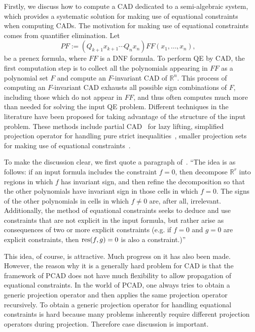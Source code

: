 \documentclass[10pt]{article}
\def\R {\ensuremath{\mathbb{R}}}
\newcommand{\res}[1]{\mbox{{\rm res}$(#1)$}}
\newcommand{\CCAD}{{PCAD}}
\newcommand{\CAD}{{CAD}}
\newcommand{\QE}{{QE}}
\begin{document}
Firstly, we discuss how to compute a CAD dedicated to a semi-algebraic system, 
which provides a systematic solution for making use of equational constraints when computing CADs.
The motivation for making use of equational constraints
comes from quantifier elimination. 
Let $$PF := (Q_{k+1}x_{k+1}\cdots Q_nx_n)FF(x_1,\ldots,x_n),$$ be 
a prenex formula, where $FF$ is a DNF formula. 
To perform {\QE} by {\CAD},
 the first computation step is to collect all the polynomials 
appearing in $FF$ as a polynomial set $F$ and compute an $F$-invariant CAD of $\R^n$.
This process of computing an $F$-invariant CAD  exhausts all possible sign combinations of $F$, 
including those which do not appear in $FF$, 
and thus often computes much more than needed for solving the input QE problem.
Different techniques in the literature have been proposed for taking advantage of the structure of the input problem.
These methods include partial CAD~\cite{ch91} for lazy lifting, 
simplified projection operator for handling pure strict inequalities~\cite{scott93,adam00}, 
smaller projection sets for making use of equational constraints~\cite{Collins98, McCallum2001, Brown05, McCallum2009}.


To make the discussion clear, we first quote a paragraph of~\cite{Brown05}.
``The idea is as follows: if an input formula includes the constraint $f=0$, 
then decompose $\R^r$ into regions in which $f$ has invariant sign, 
and then refine the decomposition so that the other polynomials 
have invariant sign in those cells in which $f=0$. 
The signs of the other polynomials in cells in which $f\neq0$ are, 
after all, irrelevant. 
Additionally, the method of equational constraints seeks 
to deduce and use constraints that are not explicit in the input 
formula, but rather arise as consequences of two or more explicit
constraints (e.g. if $f=0$ and $g=0$ are explicit constraints, 
then $\res{f,g}=0$ is also a constraint.)''

This idea, of course, is attractive.
Much progress on it has also been made. 
However, the reason why it is a generally hard problem 
for CAD is that the framework of {\CCAD} does not have 
much flexibility to allow propagation of equational constraints. 
In the world of {\CCAD}, one always tries to obtain a generic 
projection operator and then applies the same projection operator 
recursively. To obtain a generic projection operator 
for handling equational constraints is hard
because many problems inherently require different projection operators
during projection. 
Therefore case discussion is important.
\end{document}
